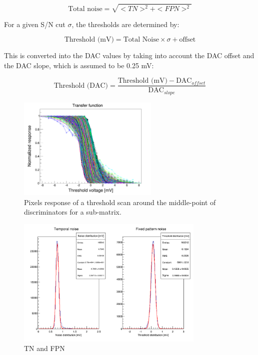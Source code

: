   \begin{equation}
    \text{Total noise} = \sqrt{<TN>^2 + <FPN>^2}
  \end{equation}

  For a given S/N cut $\sigma$, the thresholds are determined by:

  \begin{equation}
    \text{Threshold (mV)} = \text{Total Noise} \times \sigma + \text{offset}
  \end{equation}

  This is converted into the DAC values by taking into account the DAC offset and the DAC slope, which is assumed to be 0.25 mV:
  
  \begin{equation}
    \text{Threshold (DAC)} = \frac{\text{Threshold (mV)} - \text{DAC}_{offset}}{\text{DAC}_{slope}}
  \end{equation}
 
  \begin{figure}
    \centering
    \includegraphics[width=0.6\textwidth]{Pictures/labTests/transfer_B.png}
    \caption{Pixels response of a threshold scan around the middle-point of discriminators for a sub-matrix.}
    \label{fig:transfer}
  \end{figure}

  \begin{figure}
    \centering
    \includegraphics[width=0.8\textwidth]{Pictures/labTests/noise_A.png}
    \caption{TN and FPN}
    \label{fig:TN&FPN}
  \end{figure}

